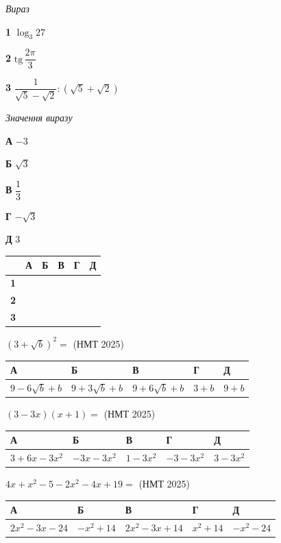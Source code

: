 \documentclass[14pt]{extarticle}
\newcommand{\answerTable}[5]{
\begin{center}
\begin{tabular}{|*{5}{>{\centering\arraybackslash}m{2.8cm}|}}
\hline
\rule[-0.3cm]{0pt}{0.8cm}\textbf{А} & \textbf{Б} & \textbf{В} & \textbf{Г} & \textbf{Д} \\
\hline
\rule[-0.4cm]{0pt}{1.0cm}#1 & \rule[-0.4cm]{0pt}{1.0cm}#2 & \rule[-0.4cm]{0pt}{1.0cm}#3 & \rule[-0.4cm]{0pt}{1.0cm}#4 & \rule[-0.4cm]{0pt}{1.0cm}#5 \\
\hline
\end{tabular}
\end{center}
}
\newcommand{\matchTable}{
\begin{tabular}{|>{\centering\arraybackslash}p{0.25cm}|*{5}{>{\centering\arraybackslash}p{0.25cm}|}}
\hline
& \scriptsize\textbf{А} & \scriptsize\textbf{Б} & \scriptsize\textbf{В} & \scriptsize\textbf{Г} & \scriptsize\textbf{Д} \\
\hline
\scriptsize\textbf{1} & \rule{0pt}{0.25cm} & & & & \\
\hline
\scriptsize\textbf{2} & \rule{0pt}{0.25cm} & & & & \\
\hline
\scriptsize\textbf{3} & \rule{0pt}{0.25cm} & & & & \\
\hline
\end{tabular}
}
\newcommand{\task}[2]{\noindent\makebox[1.5em][l]{\textbf{#1.}}\parbox[t]{\dimexpr\textwidth-1.5em}{#2}}
\newcommand{\nmtyear}[1]{\hfill{\small\color{yearcolor}(НМТ #1)}}
\begin{document}
\vspace{0.3cm}
\noindent
\begin{minipage}[t]{0.35\textwidth}
\vspace{0pt}
\textit{Вираз}

\vspace{0.2cm}
\textbf{1} \quad $\log_3 27$

\vspace{0.3cm}
\textbf{2} \quad $\mathrm{tg}\,\dfrac{2\pi}{3}$

\vspace{0.3cm}
\textbf{3} \quad $\dfrac{1}{\sqrt{5} - \sqrt{2}} : (\sqrt{5} + \sqrt{2})$
\end{minipage}
\hfill
\begin{minipage}[t]{0.3\textwidth}
\vspace{0pt}
\textit{Значення виразу}

\vspace{0.2cm}
\textbf{А} \quad $-3$

\vspace{0.2cm}
\textbf{Б} \quad $\sqrt{3}$

\vspace{0.2cm}
\textbf{В} \quad $\dfrac{1}{3}$

\vspace{0.2cm}
\textbf{Г} \quad $-\sqrt{3}$

\vspace{0.2cm}
\textbf{Д} \quad $3$
\end{minipage}
\hfill
\begin{minipage}[t]{0.18\textwidth}
\vspace{0pt}
\matchTable
\end{minipage}

\vspace{0.7cm}

\task{29}{$(3 + \sqrt{b})^2 =$ \nmtyear{2025}}
\answerTable{$9 - 6\sqrt{b} + b$}{$9 + 3\sqrt{b} + b$}{$9 + 6\sqrt{b} + b$}{$3 + b$}{$9 + b$}

\vspace{0.5cm}

\task{30}{$(3 - 3x)(x + 1) =$ \nmtyear{2025}}
\answerTable{$3 + 6x - 3x^2$}{$-3x - 3x^2$}{$1 - 3x^2$}{$-3 - 3x^2$}{$3 - 3x^2$}

\vspace{0.5cm}

\task{31}{$4x + x^2 - 5 - 2x^2 - 4x + 19 =$ \nmtyear{2025}}
\answerTable{$2x^2 - 3x - 24$}{$-x^2 + 14$}{$2x^2 - 3x + 14$}{$x^2 + 14$}{$-x^2 - 24$}
\end{document}
